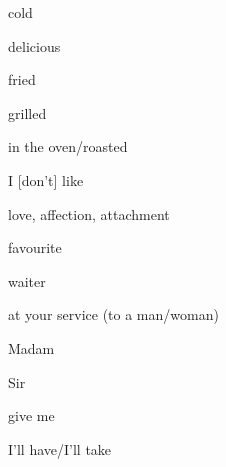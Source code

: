 \begin{flashcard}{\LARGE cold}
\LARGE {}
\end{flashcard}
\begin{flashcard}{\LARGE delicious}
\LARGE {}
\end{flashcard}
\begin{flashcard}{\LARGE fried}
\LARGE {}
\end{flashcard}
\begin{flashcard}{\LARGE grilled}
\LARGE {}
\end{flashcard}
\begin{flashcard}{\LARGE in the oven/roasted}
\LARGE {}
\end{flashcard}
\begin{flashcard}{\LARGE I {[}don't{]} like}
\LARGE {}
\end{flashcard}
\begin{flashcard}{\LARGE love, affection, attachment}
\LARGE {}
\end{flashcard}
\begin{flashcard}{\LARGE favourite}
\LARGE {}
\end{flashcard}
\begin{flashcard}{\LARGE waiter}
\LARGE {}
\end{flashcard}
\begin{flashcard}{\LARGE at your service (to a man/woman)}
\LARGE {}
\end{flashcard}
\begin{flashcard}{\LARGE Madam}
\LARGE {}
\end{flashcard}
\begin{flashcard}{\LARGE Sir}
\LARGE {}
\end{flashcard}
\begin{flashcard}{\LARGE give me}
\LARGE {}
\end{flashcard}
\begin{flashcard}{\LARGE I'll have/I'll take}
\LARGE {}
\end{flashcard}
